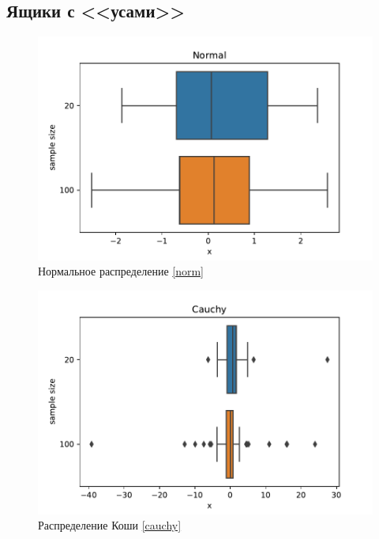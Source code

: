 \documentclass[a4paper]{article}
\begin{document}
\subsection{Ящики с <<усами>>}
\begin{figure}[H]
    \centering
    \includegraphics[width = 16 cm]{sources/NormalBox.pdf}
    \caption{Нормальное распределение \eqref{norm}}
    \label{fig:normBox}
\end{figure}
\begin{figure}[H]
    \centering
    \includegraphics[width = 16 cm]{sources/CauchyBox.pdf}
    \caption{Распределение Коши \eqref{cauchy}}
    \label{fig:cauchyBox}
\end{figure}
\end{document}
